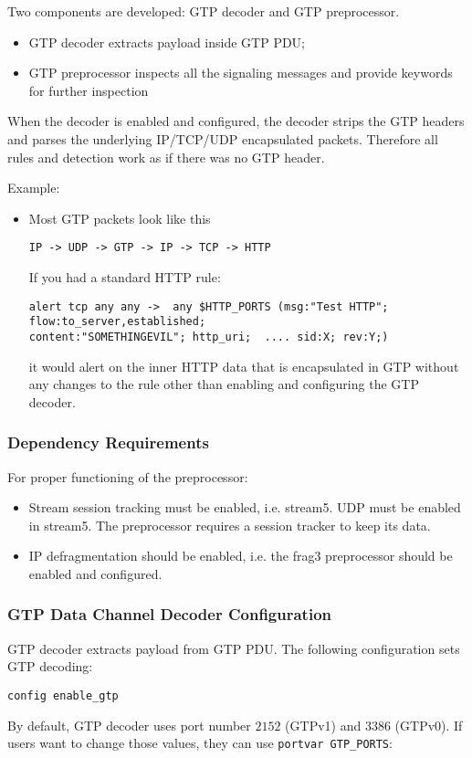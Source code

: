 \documentclass[english]{report}
\begin{document}
Two components are developed: GTP decoder and GTP preprocessor. 
\begin{itemize}
\item GTP decoder extracts payload inside GTP PDU; 
\item GTP preprocessor inspects all the signaling messages and provide keywords for
further inspection
\end{itemize}

When the decoder is enabled and configured, the decoder strips the GTP headers 
and parses the underlying IP/TCP/UDP encapsulated packets. Therefore all rules
and detection work as if there was no GTP header.

Example:

\begin{itemize}
\item[]
Most GTP packets look like this
\begin{verbatim}
IP -> UDP -> GTP -> IP -> TCP -> HTTP
\end{verbatim}

If you had a standard HTTP rule:
\begin{verbatim}
alert tcp any any ->  any $HTTP_PORTS (msg:"Test HTTP"; flow:to_server,established; 
content:"SOMETHINGEVIL"; http_uri;  .... sid:X; rev:Y;)
\end{verbatim}
it would alert on the inner HTTP data that is encapsulated in GTP without any changes
 to the rule other than enabling and configuring the GTP decoder.
\end{itemize}

\subsubsection{Dependency Requirements}

For proper functioning of the preprocessor:
\begin{itemize}

\item Stream session tracking must be enabled, i.e. stream5. UDP must be
      enabled in stream5. The preprocessor requires a session tracker to keep its 
      data. 

\item  IP defragmentation should be enabled, i.e. the frag3 preprocessor should be
      enabled and configured.

\end{itemize}

\subsubsection{GTP Data Channel Decoder Configuration}
GTP decoder extracts payload from GTP PDU. The following configuration sets 
GTP decoding:
\begin{verbatim}
config enable_gtp
\end{verbatim}
By default, GTP decoder uses port number $2152$ (GTPv1) and $3386$ (GTPv0). 
If users want to change those values, they can use \texttt{portvar GTP\_PORTS}:
\end{document}
